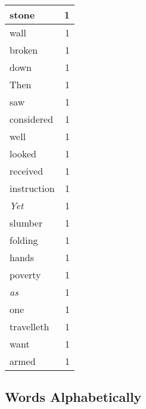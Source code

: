 \begin{center}
\begin{longtable}{l|r}
stone & 1\\ \hline 
wall & 1\\ \hline 
broken & 1\\ \hline 
down & 1\\ \hline 
Then & 1\\ \hline 
saw & 1\\ \hline 
considered & 1\\ \hline 
well & 1\\ \hline 
looked & 1\\ \hline 
received & 1\\ \hline 
instruction & 1\\ \hline 
\emph{Yet} & 1\\ \hline 
slumber & 1\\ \hline 
folding & 1\\ \hline 
hands & 1\\ \hline 
poverty & 1\\ \hline 
\emph{as} & 1\\ \hline 
one & 1\\ \hline 
travelleth & 1\\ \hline 
want & 1\\ \hline 
armed & 1\\ \hline 
\end{longtable}  
\end{center}  


  
\normalsize  

  
  


\subsection{Words Alphabetically}

